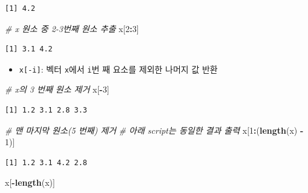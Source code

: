 \documentclass[
  11pt,
]{krantz}
\newenvironment{Shaded}{\begin{snugshade}}{\end{snugshade}}
\newcommand{\CommentTok}[1]{\textcolor[rgb]{0.37,0.37,0.37}{\textit{#1}}}
\newcommand{\DecValTok}[1]{\textcolor[rgb]{0.06,0.06,0.06}{#1}}
\newcommand{\KeywordTok}[1]{\textcolor[rgb]{0.27,0.27,0.27}{\textbf{#1}}}
\newcommand{\NormalTok}[1]{#1}
\newcommand{\OperatorTok}[1]{\textcolor[rgb]{0.43,0.43,0.43}{\textbf{#1}}}
\newcommand{\StringTok}[1]{\textcolor[rgb]{0.5,0.5,0.5}{#1}}
\providecommand{\tightlist}{%
  \setlength{\itemsep}{0pt}\setlength{\parskip}{0pt}}
\begin{document}
\begin{verbatim}
[1] 4.2
\end{verbatim}

\begin{Shaded}
\begin{Highlighting}[]
\CommentTok{# x 원소 중 2-3번째 원소 추출}
\NormalTok{x[}\DecValTok{2}\OperatorTok{:}\DecValTok{3}\NormalTok{]}
\end{Highlighting}
\end{Shaded}

\begin{verbatim}
[1] 3.1 4.2
\end{verbatim}

\normalsize

\begin{itemize}
\tightlist
\item
  \texttt{x{[}-i{]}}: 벡터 \texttt{x}에서 \texttt{i}번 째 요소를 제외한 나머지 값 반환
\end{itemize}

\footnotesize

\begin{Shaded}
\begin{Highlighting}[]
\CommentTok{# x의 3 번째 원소 제거}
\NormalTok{x[}\OperatorTok{-}\DecValTok{3}\NormalTok{]}
\end{Highlighting}
\end{Shaded}

\begin{verbatim}
[1] 1.2 3.1 2.8 3.3
\end{verbatim}

\begin{Shaded}
\begin{Highlighting}[]
\CommentTok{# 맨 마지막 원소(5 번째) 제거}
\CommentTok{# 아래 script는 동일한 결과 출력}
\NormalTok{x[}\DecValTok{1}\OperatorTok{:}\NormalTok{(}\KeywordTok{length}\NormalTok{(x) }\OperatorTok{-}\StringTok{ }\DecValTok{1}\NormalTok{)]}
\end{Highlighting}
\end{Shaded}

\begin{verbatim}
[1] 1.2 3.1 4.2 2.8
\end{verbatim}

\begin{Shaded}
\begin{Highlighting}[]
\NormalTok{x[}\OperatorTok{-}\KeywordTok{length}\NormalTok{(x)]}
\end{Highlighting}
\end{Shaded}
\end{document}
